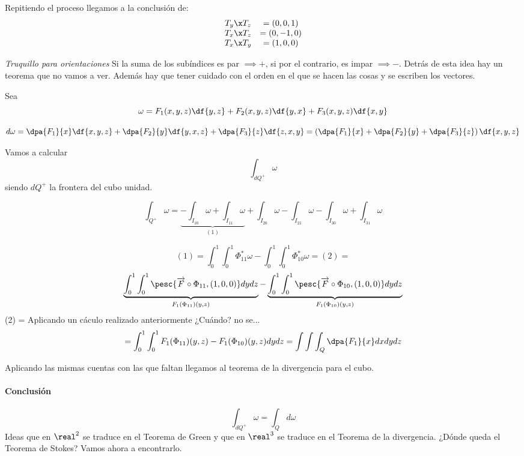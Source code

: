 Repitiendo el proceso llegamos a la conclusión de: \[
\begin{array}{cc}
T_y\x T_z &= (0,0,1)\\
T_x\x T_z &= (0,-1,0)\\
T_x\x T_y &= (1,0,0)
\end{array}\]

\textit{Truquillo para orientaciones} Si la suma de los subíndices es par $\implies +$, si por el contrario, es impar $\implies -$. Detrás de esta idea hay un teorema que no vamos a ver. Además hay que tener cuidado con el orden en el que se hacen las cosas y se escriben los vectores.

Sea
\[\omega = F_1(x,y,z)\df{y,z}+F_2(x,y,z)\df{y,x}+F_3(x,y,z)\df{x,y}\]
 
\[d\omega = \dpa{F_1}{x}\df{x,y,z} + \dpa{F_2}{y}\df{y,x,z} + \dpa{F_3}{z}\df{z,x,y} = \left(\dpa{F_1}{x}+\dpa{F_2}{y} + \dpa{F_3}{z}\right) \df{x,y,z}
\]

Vamos a calcular \[\int_{dQ^+} \omega\] siendo $dQ^+$ la frontera del cubo unidad.

\[\int_{Q^+} \omega =\underbrace{ -\int_{I_{10}} \omega +  \int_{I_{11}} \omega}_{(1)} + \int_{I_{20}} \omega -  \int_{I_{21}} \omega  -\int_{I_{30}} \omega +  \int_{I_{31}} \omega\]

\[
(1) = \int_0^1\int_0^1\Phi^{\ast}_{11}\omega - \int_0^1\int_0^1 \Phi^{\ast}_{10} \omega = (2) =\]
\[
 \underbrace{\int_0^1\int_0^1 \pesc{\overrightarrow{F}\circ \Phi_{11},(1,0,0)}dydz}_{F_1(\Phi_{11})(y,z)}
 - \underbrace{ \int_0^1\int_0^1 \pesc{\overrightarrow{F}\circ \Phi_{10},(1,0,0)}dydz}_{F_1(\Phi_{10})(y,z)}
\]
(2) = Aplicando un cáculo realizado anteriormente ¿Cuándo? no se...
\[
= \int_0^1\int_0^1 F_1(\Phi_{11})(y,z)-F_1(\Phi_{10})(y,z)dydz = \int\int\int_Q \dpa{F_1}{x}dxdydz
\]

Aplicando las mismas cuentas con las que faltan llegamos al teorema de la divergencia para el cubo.


\paragraph{Conclusión}
\[\int_{dQ^+} \omega = \int_{Q}d\omega\]
Ideas que en $\real^2$ se traduce en el Teorema de Green y que en $\real^3$ se traduce en el Teorema de la divergencia. ¿Dónde queda el Teorema de Stokes? Vamos ahora a encontrarlo.



